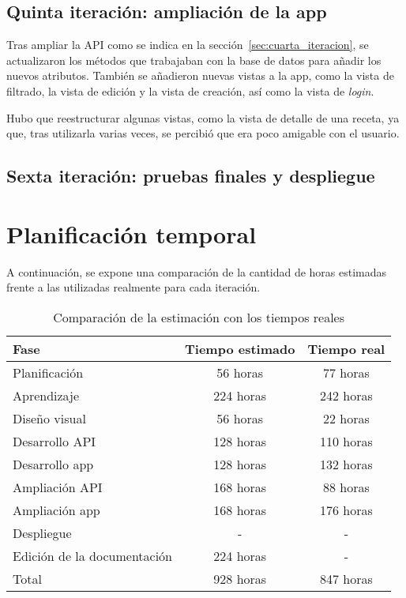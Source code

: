 \subsection{Quinta iteración: ampliación de la app}
\label{sec:quinta_iteracion}

Tras ampliar la API como se indica en la sección~\ref{sec:cuarta_iteracion},
se actualizaron los métodos que trabajaban con la base de datos para añadir
los nuevos atributos. También se añadieron nuevas vistas a la app, como la vista
de filtrado, la vista de edición y la vista de creación, así como la vista de
\textit{login}.

Hubo que reestructurar algunas vistas, como la vista de detalle de una receta,
ya que, tras utilizarla varias veces, se percibió que era poco amigable con el
usuario.

\subsection{Sexta iteración: pruebas finales y despliegue}
\label{sec:sexta_iteracion}




\section{Planificación temporal}
\label{sec:planificacion}

A continuación, se expone una comparación de la cantidad de horas estimadas
frente a las utilizadas realmente para cada iteración.

\begin{table}[hbtp]
  \centering
  \begin{tabular}{|l|c|c|}
    \hline
    \textbf{Fase} & \textbf{Tiempo estimado} & \textbf{Tiempo real} \\
    \hline
    Planificación & 56 horas & 77 horas \\
    \hline
    Aprendizaje & 224 horas & 242 horas \\
    \hline
    Diseño visual & 56 horas & 22 horas \\
    \hline
    Desarrollo API & 128 horas & 110 horas \\
    \hline
    Desarrollo app & 128 horas & 132 horas \\
    \hline
    Ampliación API & 168 horas & 88 horas \\
    \hline
    Ampliación app & 168 horas & 176 horas \\
    \hline
    Despliegue & - & - \\
    \hline
    Edición de la documentación & 224 horas & - \\
    \hline
    Total & 928 horas & 847 horas \\
    \hline
  \end{tabular}
  \caption{Comparación de la estimación con los tiempos reales}
  \label{tab:estimacion_tiempo}
\end{table}

